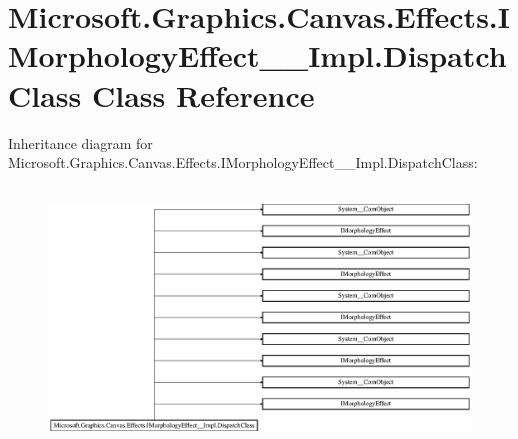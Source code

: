 \hypertarget{class_microsoft_1_1_graphics_1_1_canvas_1_1_effects_1_1_i_morphology_effect_____impl_1_1_dispatch_class}{}\section{Microsoft.\+Graphics.\+Canvas.\+Effects.\+I\+Morphology\+Effect\+\_\+\+\_\+\+Impl.\+Dispatch\+Class Class Reference}
\label{class_microsoft_1_1_graphics_1_1_canvas_1_1_effects_1_1_i_morphology_effect_____impl_1_1_dispatch_class}
Inheritance diagram for Microsoft.\+Graphics.\+Canvas.\+Effects.\+I\+Morphology\+Effect\+\_\+\+\_\+\+Impl.\+Dispatch\+Class\+:\begin{figure}[H]
\begin{center}
\leavevmode
\includegraphics[height=6.905830cm]{class_microsoft_1_1_graphics_1_1_canvas_1_1_effects_1_1_i_morphology_effect_____impl_1_1_dispatch_class}
\end{center}
\end{figure}
